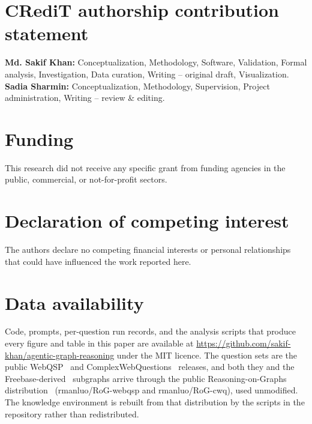 \documentclass[preprint,review,12pt]{elsarticle}
\begin{document}
\section*{CRediT authorship contribution statement}
\textbf{Md. Sakif Khan:} Conceptualization, Methodology, Software,
Validation, Formal analysis, Investigation, Data curation, Writing --
original draft, Visualization. \textbf{Sadia Sharmin:}
Conceptualization, Methodology, Supervision, Project administration,
Writing -- review \& editing.

\section*{Funding}
This research did not receive any specific grant from funding agencies
in the public, commercial, or not-for-profit sectors.

\section*{Declaration of competing interest}
The authors declare no competing financial interests or personal
relationships that could have influenced the work reported here.

\section*{Data availability}
Code, prompts, per-question run records, and the analysis scripts that
produce every figure and table in this paper are available at
\url{https://github.com/sakif-khan/agentic-graph-reasoning} under the
MIT licence. The question sets are the public WebQSP~\cite{yih2016value}
and ComplexWebQuestions~\cite{talmor2018web} releases, and both they
and the Freebase-derived~\cite{bollacker2008freebase} subgraphs arrive
through the public Reasoning-on-Graphs
distribution~\cite{luo2024reasoning} (\textsf{rmanluo/RoG-webqsp} and
\textsf{rmanluo/RoG-cwq}), used unmodified. The knowledge environment
is rebuilt from that distribution by the scripts in the repository
rather than redistributed.

%
\end{document}
